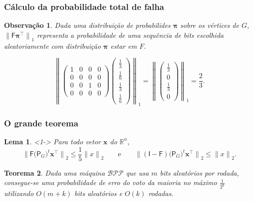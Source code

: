 \documentclass{beamer}
\def\MMR{\mathbb{R}} %
\def\MMp{\mathrm{.}} %
\def\leq{\leqslant} %
\def\clBPP{\mathcal{BPP}}
\def\vetor#1{\boldsymbol{#1}}
\def\matriz#1{\mathsf{#1}}
\def\norma#1#2{{\lVert{#2}\rVert}_{#1}}
\def\lrnorma#1#2{{\left\lVert{#2}\right\rVert}_{#1}}
\def\transp#1{{#1}^{\scriptscriptstyle \top}}
\theoremstyle{teoaxicorlem}
\newtheorem{Teo}{Teorema}
\newtheorem{Lem}[Teo]{Lema}
\theoremstyle{defnotnom}
\newtheorem{Obs}{Observação}
\begin{document}
\begin{frame}
  \frametitle{Cálculo da probabilidade total de falha}
  \begin{Obs}
    Dada uma distribuição de probabilides $\vetor \pi$ sobre os vértices
    de
    $G$, $\norma1{\matriz F\transp{\vetor \pi}}$ representa a
    probabilidade de uma sequência de \textit{bits} escolhida
    aleatoriamente com distribuição $\vetor\pi$ estar em $F$.
  \end{Obs}
  \vfill\pause
  \begin{equation*}
    \lrnorma1{
      \begin{pmatrix}
        1 & 0 & 0 & 0 \\
        0 & 0 & 0 & 0 \\
        0 & 0 & 1 & 0 \\
        0 & 0 & 0 & 0
      \end{pmatrix}
      \begin{pmatrix}
        \frac13 \\ \frac16 \\ \frac13 \\ \frac16
      \end{pmatrix}
    } = \lrnorma1{
      \begin{pmatrix}
        \frac13 \\ 0 \\ \frac13 \\ 0
      \end{pmatrix}
    }
    = \frac23\MMp
  \end{equation*}
\end{frame}

\begin{frame}
  \frametitle{O grande teorema}
  \begin{Lem}<1->
    Para todo vetor $\vetor x$ do $\MMR^n$,
    \begin{equation*}
      \norma2{\matriz F{\bigl({\matriz P}_G\bigr)}^t\transp{\vetor x}}
      \leq \frac15\norma2 x
      \qquad\text{e}\qquad
      \norma2{(\matriz I - \matriz F){\bigl({\matriz P}_G\bigr)}^t\transp{\vetor x}}
      \leq \norma2 x\MMp
    \end{equation*}
  \end{Lem}
  \vfill
  \begin{Teo}
    Dada uma máquina $\clBPP$ que usa $m$ \textit{bits} aleatórios por
    rodada, consegue-se uma probabilidade de erro do voto da maioria no
    máximo $\frac{1}{2^k}$ utilizando $O(m+k)$ \textit{bits} aleatórios
    e
    $O(k)$ rodadas.
  \end{Teo}
\end{frame}
\end{document}
